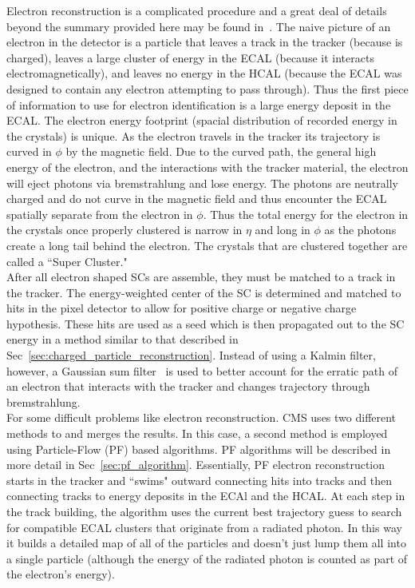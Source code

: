 	Electron reconstruction is a complicated procedure and a great deal of details beyond the summary provided here may be found in~\cite{baffiReco,egmReco,egm201}. The naive picture of an electron in the detector is a particle that leaves a track in the tracker (because is charged), leaves a large cluster of energy in the ECAL (because it interacts electromagnetically), and leaves no energy in the HCAL (because the ECAL was designed to contain any electron attempting to pass through). Thus the first piece of information to use for electron identification is a large energy deposit in the ECAL. The electron energy footprint (spacial distribution of recorded energy in the crystals) is unique. As the electron travels in the tracker its trajectory is curved in $\phi$ by the magnetic field. Due to the curved path, the general high energy of the electron, and the interactions with the tracker material, the electron will eject photons via bremstrahlung and lose energy. The photons are neutrally charged and do not curve in the magnetic field and thus encounter the ECAL spatially separate from the electron in $\phi$. Thus the total energy for the electron in the crystals once properly clustered is narrow in $\eta$ and long in $\phi$ as the photons create a long tail behind the electron. The crystals that are clustered together are called a ``Super Cluster."\\
	
	After all electron shaped SCs are assemble, they must be matched to a track in the tracker. The energy-weighted center of the SC is determined and matched to hits in the pixel detector to allow for positive charge or negative charge hypothesis. These hits are used as a seed which is then propagated out to the SC energy in a method similar to that described in  Sec~\ref{sec:charged_particle_reconstruction}. Instead of using a Kalmin filter, however, a Gaussian sum filter~\cite{gsf} is used to better account for the erratic path of an electron that interacts with the tracker and changes trajectory through bremstrahlung.\\
	
	For some difficult problems like electron reconstruction. CMS uses two different methods to and merges the results. In this case, a second method is employed using Particle-Flow (PF) based algorithms. PF algorithms will be described in more detail in Sec~\ref{sec:pf_algorithm}. Essentially, PF electron reconstruction starts in the tracker and ``swims" outward connecting hits into tracks and then connecting tracks to energy deposits in the ECAl and the HCAL. At each step in the track building, the algorithm uses the current best trajectory guess to search for compatible ECAL clusters that originate from a radiated photon. In this way it builds a detailed map of all of the particles and doesn't just lump them all into a single particle (although the energy of the radiated photon is counted as part of the electron's energy).\\
	

